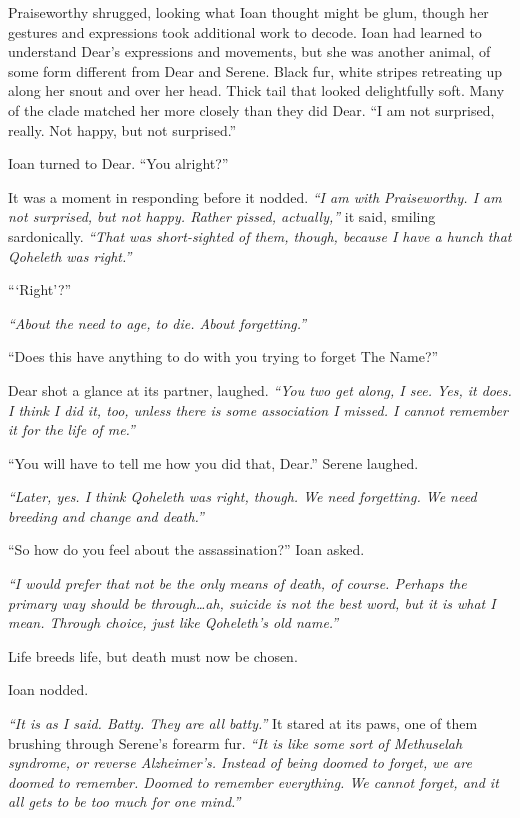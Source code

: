 Praiseworthy shrugged, looking what Ioan thought might be glum, though her gestures and expressions took additional work to decode. Ioan had learned to understand Dear's expressions and movements, but she was another animal, of some form different from Dear and Serene. Black fur, white stripes retreating up along her snout and over her head. Thick tail that looked delightfully soft. Many of the clade matched her more closely than they did Dear. ``I am not surprised, really. Not happy, but not surprised.''

Ioan turned to Dear. ``You alright?''

It was a moment in responding before it nodded. \emph{``I am with Praiseworthy. I am not surprised, but not happy. Rather pissed, actually,''} it said, smiling sardonically. \emph{``That was short-sighted of them, though, because I have a hunch that Qoheleth was right.''}

```Right'?''

\emph{``About the need to age, to die. About forgetting.''}

``Does this have anything to do with you trying to forget The Name?''

Dear shot a glance at its partner, laughed. \emph{``You two get along, I see. Yes, it does. I think I did it, too, unless there is some association I missed. I cannot remember it for the life of me.''}

``You will have to tell me how you did that, Dear.'' Serene laughed.

\emph{``Later, yes. I think Qoheleth was right, though. We need forgetting. We need breeding and change and death.''}

``So how do you feel about the assassination?'' Ioan asked.

\emph{``I would prefer that not be the only means of death, of course. Perhaps the primary way should be through\ldots{}ah, suicide is not the best word, but it is what I mean. Through choice, just like Qoheleth's old name.''}

Life breeds life, but death must now be chosen.

Ioan nodded.

\emph{``It is as I said. Batty. They are all batty.''} It stared at its paws, one of them brushing through Serene's forearm fur. \emph{``It is like some sort of Methuselah syndrome, or reverse Alzheimer's. Instead of being doomed to forget, we are doomed to remember. Doomed to remember everything. We cannot forget, and it all gets to be too much for one mind.''}

